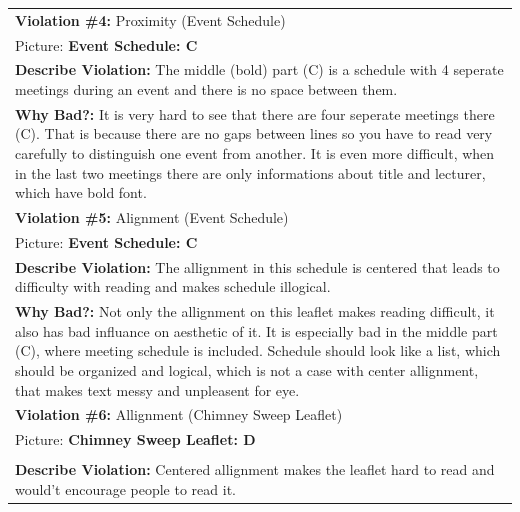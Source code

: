 \documentclass[a4paper,11pt,oneside]{scrreprt}
\begin{document}
\begin{tabularx}{\textwidth}{|X|}
	\hline	
	
	\textbf{Violation \#4:} Proximity (Event Schedule)\\
	
	Picture: \textbf{Event Schedule: C}
	\\
	
	\textbf{Describe Violation:} The middle (bold) part (C) is a schedule with 4 seperate meetings during an event and there is no space between them.
	
	\\
	\textbf{Why Bad?:} It is very hard to see that there are four seperate meetings there (C). That is because there are no gaps between lines so you have to read very carefully to distinguish one event from another. It is even more difficult, when in the last two meetings there are only informations about title and lecturer, which have bold font.
	
	\\
	\hline	
	
	\textbf{Violation \#5:} Alignment (Event Schedule)\\
	
	Picture: \textbf{Event Schedule: C}
	
	\\
	\textbf{Describe Violation:} The allignment in this schedule is centered that leads to difficulty with reading and makes schedule illogical. 
	
	\\
	\textbf{Why Bad?:} Not only the allignment on this leaflet makes reading difficult, it also has bad influance on aesthetic of it. It is especially bad in the middle part (C), where meeting schedule is included. Schedule should look like a list, which should be organized and logical, which is not a case with center allignment, that makes text messy and unpleasent for eye.
	
	\\
	\hline	
	
	\textbf{Violation \#6:} Allignment (Chimney Sweep Leaflet)\\
	
	Picture: \textbf{Chimney Sweep Leaflet: D}\\
	
	\\
	
	\textbf{Describe Violation:} Centered allignment makes the leaflet hard to read and would't encourage people to read it.
	

\end{tabularx}
\end{document}
